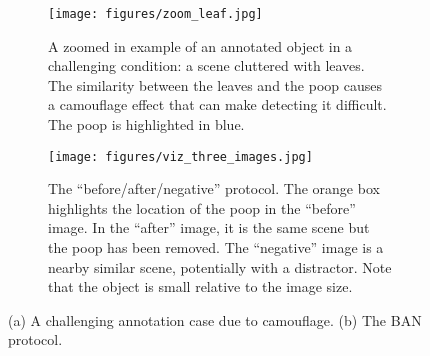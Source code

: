 \documentclass{article}
\begin{document}
\begin{figure}[t]
\centering
\begin{subfigure}[t]{0.49\textwidth}
    \centering
    \texttt{[image: figures/zoom\_leaf.jpg]}
    \caption[]{
        A zoomed in example of an annotated object in a challenging
        condition: a scene cluttered with leaves. The similarity between the leaves
        and the poop causes a camouflage effect that can make detecting it difficult.
        The poop is highlighted in blue.
    }
    \label{fig:HardCase}
\end{subfigure}
\hfill
\begin{subfigure}[t]{0.49\textwidth}
    \centering
    \texttt{[image: figures/viz\_three\_images.jpg]}
    \caption[]{
        The ``before/after/negative'' protocol.
        The orange box highlights the location of the poop 
        in the ``before'' image.
        In the ``after'' image, it is the same scene but the poop has been removed.
        The ``negative'' image is a nearby similar scene, potentially with a distractor.
        Note that the object is small relative to the image size.
    }
    \label{fig:ThreeImages}
\end{subfigure}
\caption{(a) A challenging annotation case due to camouflage. (b) The BAN protocol.}
\label{fig:Combined}
\end{figure}
  
\end{document}
